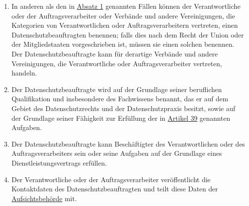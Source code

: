 \begin{enumerate}
  \item In anderen als den in \hyperref[itm:37-1]{Absatz 1} genannten Fällen können der Verantwortliche oder der
   Auftragsverarbeiter oder Verbände und andere Vereinigungen, die Kategorien von Verantwortlichen oder
   Auftragsverarbeitern vertreten, einen Datenschutzbeauftragten benennen; falls dies nach dem Recht der Union oder der
   Mitgliedstaaten vorgeschrieben ist, müssen sie einen solchen benennen. Der Datenschutzbeauftragte kann für derartige
   Verbände und andere Vereinigungen, die Verantwortliche oder Auftragsverarbeiter vertreten, handeln.
  \label{itm:37-4}

  \item Der Datenschutzbeauftragte wird auf der Grundlage seiner beruflichen Qualifikation und insbesondere des
   Fachwissens benannt, das er auf dem Gebiet des Datenschutzrechts und der Datenschutzpraxis besitzt, sowie auf der
   Grundlage seiner Fähigkeit zur Erfüllung der in \hyperref[ch:39]{Artikel 39} genannten Aufgaben.
  \label{itm:37-5}

  \item Der Datenschutzbeauftragte kann Beschäftigter des Verantwortlichen oder des Auftragsverarbeiters sein oder seine
   Aufgaben auf der Grundlage eines Dienstleistungsvertrags erfüllen.
  \label{itm:37-6}

  \item Der Verantwortliche oder der Auftragsverarbeiter veröffentlicht die Kontaktdaten des Datenschutzbeauftragten und
   teilt diese Daten der \hyperref[itm:04-21]{Aufsichtsbehörde} mit.
  \label{itm:37-7}

\end{enumerate}


